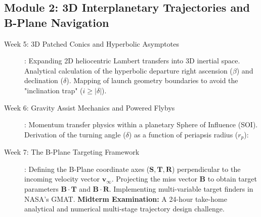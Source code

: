 \documentclass[11pt, letterpaper]{article}
\begin{document}
\subsection*{Module 2: 3D Interplanetary Trajectories and B-Plane Navigation}
\begin{description}
    \item[Week 5: 3D Patched Conics and Hyperbolic Asymptotes]: Expanding 2D heliocentric Lambert transfers into 3D inertial space. Analytical calculation of the hyperbolic departure right ascension ($\beta$) and declination ($\delta$). Mapping of launch geometry boundaries to avoid the "inclination trap" ($i \ge |\delta|$).
    
    \item[Week 6: Gravity Assist Mechanics and Powered Flybys]: Momentum transfer physics within a planetary Sphere of Influence (SOI). Derivation of the turning angle ($\delta$) as a function of periapsis radius ($r_p$):
    
    \item[Week 7: The B-Plane Targeting Framework]: Defining the B-Plane coordinate axes ($\mathbf{S}, \mathbf{T}, \mathbf{R}$) perpendicular to the incoming velocity vector $\mathbf{v}_\infty$. Projecting the miss vector $\mathbf{B}$ to obtain target parameters $\mathbf{B}\cdot\mathbf{T}$ and $\mathbf{B}\cdot\mathbf{R}$. Implementing multi-variable target finders in NASA's GMAT.
    \textbf{Midterm Examination:} A 24-hour take-home analytical and numerical multi-stage trajectory design challenge.
\end{description}
\end{document}
